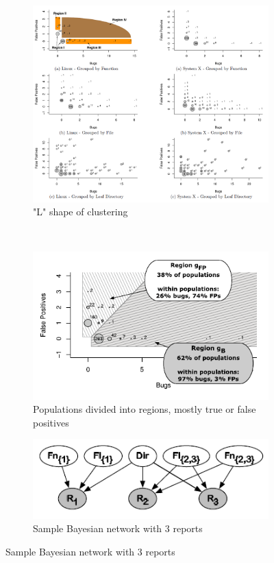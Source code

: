 \begin{figure}[H]
     \begin{subfigure}{1\textwidth}
         \centering
         \includegraphics[scale=0.4]{./src/feedback_rank_l_shape.png}
         \caption{"L" shape of clustering}\label{fr:lshape}
     \end{subfigure}\\
     \begin{subfigure}{.5\textwidth}
         \centering
         \includegraphics[scale=0.6]{./src/feedback_rank_partition.png}
         \caption{Populations divided into regions, mostly true or false positives}\label{fr:partition}
     \end{subfigure}%
     \begin{subfigure}{.7\textwidth}
         \centering
         \includegraphics[scale=0.4]{./src/feedback_rank_bayes.png}
         \caption{Sample Bayesian network with 3 reports}\label{fr:bayes}
     \end{subfigure}
 \end{figure}


